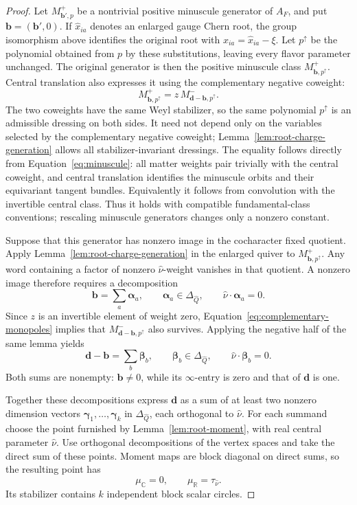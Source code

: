 \begin{proof}
Let \(M_{\mathbf b',p}^{+}\) be a nontrivial positive minuscule generator
of \(A_F\), and put \(\mathbf b=(\mathbf b',0)\).
If \(\widehat x_{ia}\) denotes an enlarged gauge Chern root, the group
isomorphism above identifies the original root with
\(x_{ia}=\widehat x_{ia}-\xi\).
Let \(p^{\uparrow}\) be the polynomial obtained from \(p\) by these
substitutions, leaving every flavor parameter unchanged.
The original generator is then the positive minuscule class
\(M_{\mathbf b,p^{\uparrow}}^{+}\).
Central translation also expresses it using the complementary negative
coweight:
\begin{equation}\label{eq:complementary-monopoles}
 M_{\mathbf b,p^{\uparrow}}^{+}
       =z\,M_{\mathbf d-\mathbf b,p^{\uparrow}}^{-}.
\end{equation}
The two coweights have the same Weyl stabilizer, so the same polynomial
\(p^{\uparrow}\) is an admissible dressing on both sides.
It need not depend only on the variables selected by the complementary
negative coweight; Lemma~\ref{lem:root-charge-generation} allows all
stabilizer-invariant dressings.
The equality follows directly from
Equation~\eqref{eq:minuscule}: all matter weights pair trivially
with the central coweight, and central translation identifies the
minuscule orbits and their equivariant tangent bundles.
Equivalently it follows from convolution with the invertible central
class.  Thus it holds with compatible fundamental-class conventions;
rescaling minuscule generators changes only a nonzero constant.

Suppose that this generator has nonzero image in the cocharacter
fixed quotient.  Apply Lemma~\ref{lem:root-charge-generation} in the
enlarged quiver to \(M_{\mathbf b,p^{\uparrow}}^{+}\).
Any word containing a factor of nonzero \(\widehat\nu\)-weight
vanishes in that quotient.  A nonzero image therefore requires a
decomposition
\[
 \mathbf b=\sum_a\boldsymbol\alpha_a,
 \qquad
 \boldsymbol\alpha_a\in\Delta_{\widehat Q},
 \qquad
 \widehat\nu\cdot\boldsymbol\alpha_a=0.
\]
Since \(z\) is an invertible element of weight zero,
Equation~\eqref{eq:complementary-monopoles} implies that
\(M_{\mathbf d-\mathbf b,p^{\uparrow}}^{-}\) also survives.  Applying the negative
half of the same lemma yields
\[
 \mathbf d-\mathbf b=\sum_b\boldsymbol\beta_b,
 \qquad
 \boldsymbol\beta_b\in\Delta_{\widehat Q},
 \qquad
 \widehat\nu\cdot\boldsymbol\beta_b=0.
\]
Both sums are nonempty: \(\mathbf b\ne0\), while its \(\infty\)-entry
is zero and that of \(\mathbf d\) is one.

Together these decompositions express \(\mathbf d\) as a sum of at
least two nonzero dimension vectors
\(\boldsymbol\gamma_1,\ldots,\boldsymbol\gamma_k\) in
\(\Delta_{\widehat Q}\), each orthogonal to \(\widehat\nu\).
For each summand choose the point furnished by
Lemma~\ref{lem:root-moment}, with real central parameter
\(\widehat\nu\).  Use orthogonal decompositions of the vertex spaces
and take the direct sum of these points.  Moment maps are block
diagonal on direct sums, so the resulting point has
\[
 \mu_{\mathbb C}=0,\qquad
 \mu_{\mathbb R}=\tau_{\widehat\nu}.
\]
Its stabilizer contains \(k\) independent block scalar circles.


\end{proof}
